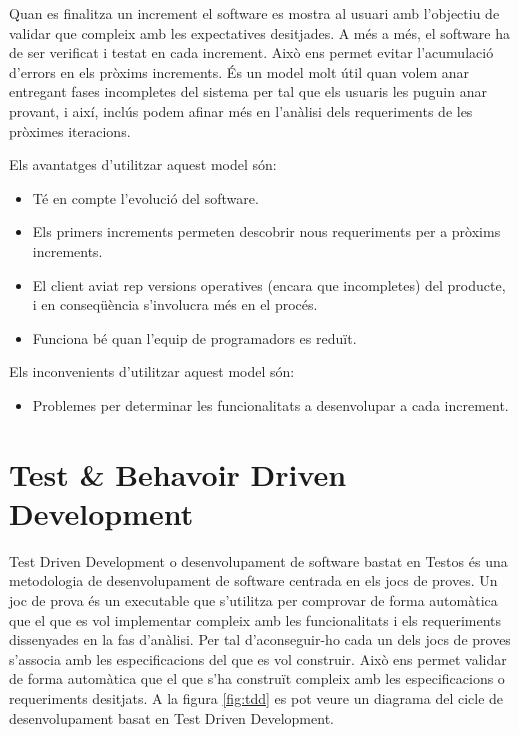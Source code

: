 Quan es finalitza un increment el software es mostra al usuari amb l'objectiu de validar que compleix amb les expectatives desitjades. A més a més, el software ha de ser verificat i testat en cada increment. Això ens permet evitar l'acumulació d'errors en els pròxims increments. És un model molt útil quan volem anar entregant fases incompletes del sistema per tal que els usuaris les puguin anar provant, i així, inclús podem afinar més en l’anàlisi dels requeriments de les pròximes iteracions.

Els avantatges d’utilitzar aquest model són:

\begin{itemize}
\item{Té en compte l’evolució del software.}
\item{Els primers increments permeten descobrir nous requeriments per a pròxims increments.}
\item{El client aviat rep versions operatives (encara que incompletes) del producte, i en conseqüència s’involucra més en el procés.}
\item{Funciona bé quan l’equip de programadors es reduït.}
\end{itemize}

Els inconvenients d’utilitzar aquest model són:

\begin{itemize}
\item{Problemes per determinar les funcionalitats a desenvolupar a cada increment.}
\end{itemize}


\section{Test \& Behavoir Driven Development}
\label{sec:tdd}

Test Driven Development o desenvolupament de software bastat en Testos és una metodologia de desenvolupament de software centrada en els jocs de proves. Un joc de prova és un executable que s'utilitza per comprovar de forma automàtica que el que es vol implementar compleix amb les funcionalitats i els requeriments dissenyades en la fas d'anàlisi. Per tal d'aconseguir-ho cada un dels jocs de proves s'associa amb les especificacions del que es vol construir. Això ens permet validar de forma automàtica que el que s'ha construït compleix amb les especificacions o requeriments desitjats. A la figura \ref{fig:tdd} es pot veure un diagrama del cicle de desenvolupament basat en Test Driven Development.

